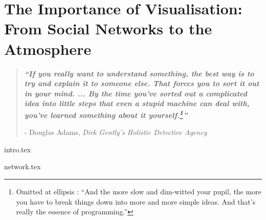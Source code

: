 


\chapter{ The Importance of Visualisation:  From Social Networks to the Atmosphere }\label{ch1}

\blankpage
\restoregeometry
\vspace*{0.15\paperheight}



\begin{center}
\begin{quotation}
  \large{\emph{\textbf{``If you really want to understand something, the best way is to try and explain it to someone else. That forces you to sort it out in your mind. ... By the time you’ve sorted out a complicated idea into little steps that even a stupid machine can deal with, you’ve learned something about it yourself.\footnote{ Omitted at ellipsis : ``And the more slow and dim-witted your pupil, the more you have to break things down into more and more simple ideas. And that’s really the essence of programming.''}''} }  }  \\
  \begin{flushright}
  - Douglas Adams, \textit{Dirk Gently's Holistic Detective Agency}
  \end{flushright}
 \end{quotation}
\end{center}
\doublespacing
\newpage

%

{intro.tex}

{network.tex}


\chapterbib
